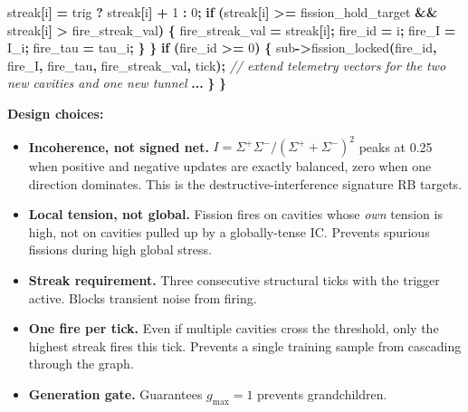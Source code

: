 \documentclass[
  11pt,
  a4paper,
]{article}
\newenvironment{Shaded}{\begin{snugshade}}{\end{snugshade}}
\newcommand{\CommentTok}[1]{\textcolor[rgb]{0.56,0.35,0.01}{\textit{#1}}}
\newcommand{\ControlFlowTok}[1]{\textcolor[rgb]{0.13,0.29,0.53}{\textbf{#1}}}
\newcommand{\DecValTok}[1]{\textcolor[rgb]{0.00,0.00,0.81}{#1}}
\newcommand{\NormalTok}[1]{#1}
\newcommand{\OperatorTok}[1]{\textcolor[rgb]{0.81,0.36,0.00}{\textbf{#1}}}
\providecommand{\tightlist}{%
  \setlength{\itemsep}{0pt}\setlength{\parskip}{0pt}}
\begin{document}
\begin{Shaded}
\begin{Highlighting}[]
\NormalTok{        streak}\OperatorTok{[}\NormalTok{i}\OperatorTok{]} \OperatorTok{=}\NormalTok{ trig }\OperatorTok{?}\NormalTok{ streak}\OperatorTok{[}\NormalTok{i}\OperatorTok{]} \OperatorTok{+} \DecValTok{1} \OperatorTok{:} \DecValTok{0}\OperatorTok{;}
        \ControlFlowTok{if} \OperatorTok{(}\NormalTok{streak}\OperatorTok{[}\NormalTok{i}\OperatorTok{]} \OperatorTok{\textgreater{}=}\NormalTok{ fission\_hold\_target }\OperatorTok{\&\&}\NormalTok{ streak}\OperatorTok{[}\NormalTok{i}\OperatorTok{]} \OperatorTok{\textgreater{}}\NormalTok{ fire\_streak\_val}\OperatorTok{)} \OperatorTok{\{}
\NormalTok{            fire\_streak\_val }\OperatorTok{=}\NormalTok{ streak}\OperatorTok{[}\NormalTok{i}\OperatorTok{];}
\NormalTok{            fire\_id }\OperatorTok{=}\NormalTok{ i}\OperatorTok{;}\NormalTok{ fire\_I }\OperatorTok{=}\NormalTok{ I\_i}\OperatorTok{;}\NormalTok{ fire\_tau }\OperatorTok{=}\NormalTok{ tau\_i}\OperatorTok{;}
        \OperatorTok{\}}
    \OperatorTok{\}}
    \ControlFlowTok{if} \OperatorTok{(}\NormalTok{fire\_id }\OperatorTok{\textgreater{}=} \DecValTok{0}\OperatorTok{)} \OperatorTok{\{}
\NormalTok{        sub}\OperatorTok{{-}\textgreater{}}\NormalTok{fission\_locked}\OperatorTok{(}\NormalTok{fire\_id}\OperatorTok{,}\NormalTok{ fire\_I}\OperatorTok{,}\NormalTok{ fire\_tau}\OperatorTok{,}\NormalTok{ fire\_streak\_val}\OperatorTok{,}\NormalTok{ tick}\OperatorTok{);}
        \CommentTok{// extend telemetry vectors for the two new cavities and one new tunnel}
        \OperatorTok{...}
    \OperatorTok{\}}
\OperatorTok{\}}
\end{Highlighting}
\end{Shaded}

\textbf{Design choices:}

\begin{itemize}
\tightlist
\item
  \textbf{Incoherence, not signed net.}
  \(I = \Sigma^+ \Sigma^- / (\Sigma^+ + \Sigma^-)^2\) peaks at 0.25 when
  positive and negative updates are exactly balanced, zero when one
  direction dominates. This is the destructive-interference signature RB
  targets.
\item
  \textbf{Local tension, not global.} Fission fires on cavities whose
  \emph{own} tension is high, not on cavities pulled up by a
  globally-tense IC. Prevents spurious fissions during high global
  stress.
\item
  \textbf{Streak requirement.} Three consecutive structural ticks with
  the trigger active. Blocks transient noise from firing.
\item
  \textbf{One fire per tick.} Even if multiple cavities cross the
  threshold, only the highest streak fires this tick. Prevents a single
  training sample from cascading through the graph.
\item
  \textbf{Generation gate.} Guarantees \(g_\text{max} = 1\) prevents
  grandchildren.
\end{itemize}
\end{document}
